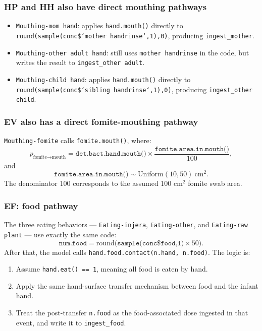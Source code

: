\documentclass[11pt]{article}
\begin{document}
\subsubsection*{HP and HH also have direct mouthing pathways}
\begin{itemize}[leftmargin=2em]
  \item \texttt{Mouthing-mom hand}: applies \texttt{hand.mouth()} directly to \texttt{round(sample(conc\$`mother handrinse`,1),0)}, producing \texttt{ingest\_mother}.
  \item \texttt{Mouthing-other adult hand}: still uses \texttt{mother handrinse} in the code, but writes the result to \texttt{ingest\_other adult}.
  \item \texttt{Mouthing-child hand}: applies \texttt{hand.mouth()} directly to \texttt{round(sample(conc\$`sibling handrinse`,1),0)}, producing \texttt{ingest\_other child}.
\end{itemize}

\subsubsection*{EV also has a direct fomite-mouthing pathway}
\texttt{Mouthing-fomite} calls \texttt{fomite.mouth()}, where:
\[
p_{\text{fomite}\to\text{mouth}}
=
\texttt{det.bact.hand.mouth()} \times \frac{\texttt{fomite.area.in.mouth()}}{100},
\]
and
\[
\texttt{fomite.area.in.mouth()} \sim \mathrm{Uniform}(10, 50)\ \mathrm{cm}^2.
\]
The denominator 100 corresponds to the assumed 100 \(\mathrm{cm}^2\) fomite swab area.

\subsubsection*{EF: food pathway}
The three eating behaviors --- \texttt{Eating-injera}, \texttt{Eating-other}, and \texttt{Eating-raw plant} --- use exactly the same code:
\[
\texttt{num.food} = \mathrm{round}\bigl(\texttt{sample(conc\$food,1)} \times 50\bigr).
\]
After that, the model calls \texttt{hand.food.contact(n.hand, n.food)}. The logic is:
\begin{enumerate}[leftmargin=2em]
  \item Assume \texttt{hand.eat() == 1}, meaning all food is eaten by hand.
  \item Apply the same hand-surface transfer mechanism between food and the infant hand.
  \item Treat the post-transfer \texttt{n.food} as the food-associated dose ingested in that event, and write it to \texttt{ingest\_food}.
\end{enumerate}
\end{document}
